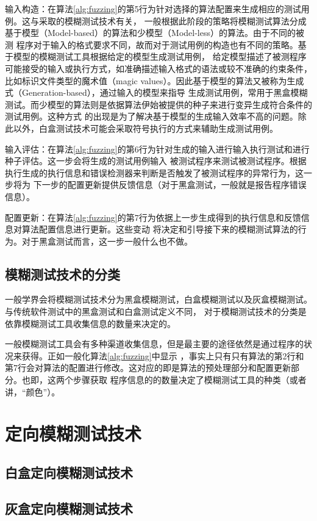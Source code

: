 \documentclass[bachelor]{njupthesis}
\begin{document}
输入构造：在算法\ref{alg:fuzzing}的第5行为针对选择的算法配置来生成相应的测试用例。这与采取的模糊测试技术有关，
一般根据此阶段的策略将模糊测试算法分成基于模型（Model-based）的算法和少模型（Model-less）的算法。由于不同的被测
程序对于输入的格式要求不同，故而对于测试用例的构造也有不同的策略。基于模型的模糊测试工具根据给定的模型生成测试用例，
给定模型描述了被测程序可能接受的输入或执行方式，如准确描述输入格式的语法或较不准确的约束条件，
比如标识文件类型的魔术值（magic values）。因此基于模型的算法又被称为生成式（Generation-based），通过输入的模型来指导
生成测试用例，常用于黑盒模糊测试。而少模型的算法则是依据算法伊始被提供的种子来进行变异生成符合条件的测试用例。这种方式
的出现是为了解决基于模型的生成输入效率不高的问题。除此以外，白盒测试技术可能会采取符号执行的方式来辅助生成测试用例。

输入评估：在算法\ref{alg:fuzzing}的第6行为针对生成的输入进行输入执行测试和进行种子评估。这一步会将生成的测试用例输入
被测试程序来测试被测试程序。根据执行生成的执行信息和错误检测器来判断是否触发了被测试程序的异常行为，这一步将为
下一步的配置更新提供反馈信息（对于黑盒测试，一般就是报告程序错误信息）。

配置更新：在算法\ref{alg:fuzzing}的第7行为依据上一步生成得到的执行信息和反馈信息对算法配置信息进行更新。这些变动
将决定和引导接下来的模糊测试算法的行为。对于黑盒测试而言，这一步一般什么也不做。

\subsection{模糊测试技术的分类}
一般学界会将模糊测试技术分为黑盒模糊测试，白盒模糊测试以及灰盒模糊测试。与传统软件测试中的黑盒测试和白盒测试\cite{myers2011art}定义不同，
对于模糊测试技术的分类是依靠模糊测试工具收集信息的数量来决定的\cite{manes2019art}。

一般模糊测试工具会有多种渠道收集信息，但是最主要的途径依然是通过程序的状况来获得。正如一般化算法\ref{alg:fuzzing}中显示
，事实上只有只有算法的第2行和第7行会对算法的配置进行修改。这对应的即是算法的预处理部分和配置更新部分。也即，这两个步骤获取
程序信息的的数量决定了模糊测试工具的种类（或者讲，“颜色”）。
\section{定向模糊测试技术}
\subsection{白盒定向模糊测试技术}
\subsection{灰盒定向模糊测试技术}
\end{document}

